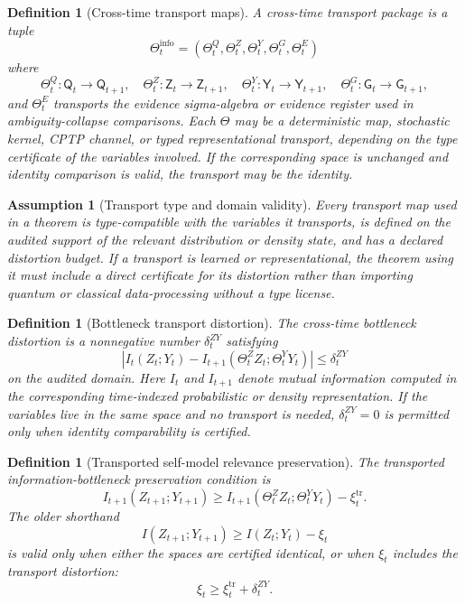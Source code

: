 \documentclass[11pt]{article}
\newtheorem{definition}[theorem]{Definition}
\newtheorem{assumption}[theorem]{Assumption}
\newcommand{\1}{\mathbf{1}}
\begin{document}
\begin{definition}[Cross-time transport maps]
A cross-time transport package is a tuple
\[
\Theta_t^{\mathrm{info}}
=
(\Theta_t^Q,\Theta_t^Z,\Theta_t^Y,\Theta_t^G,\Theta_t^E)
\]
where
\[
\Theta_t^Q:\mathsf Q_t\to\mathsf Q_{t+1},
\quad
\Theta_t^Z:\mathsf Z_t\to\mathsf Z_{t+1},
\quad
\Theta_t^Y:\mathsf Y_t\to\mathsf Y_{t+1},
\quad
\Theta_t^G:\mathsf G_t\to\mathsf G_{t+1},
\]
and \(\Theta_t^E\) transports the evidence sigma-algebra or evidence register used in ambiguity-collapse comparisons. Each \(\Theta\) may be a deterministic map, stochastic kernel, CPTP channel, or typed representational transport, depending on the type certificate of the variables involved. If the corresponding space is unchanged and identity comparison is valid, the transport may be the identity.
\end{definition}

\begin{assumption}[Transport type and domain validity]
\label{ass:transport_type_domain_validity}
Every transport map used in a theorem is type-compatible with the variables it transports, is defined on the audited support of the relevant distribution or density state, and has a declared distortion budget. If a transport is learned or representational, the theorem using it must include a direct certificate for its distortion rather than importing quantum or classical data-processing without a type license.
\end{assumption}

\begin{definition}[Bottleneck transport distortion]
\label{def:bottleneck_transport_distortion}
The cross-time bottleneck distortion is a nonnegative number \(\delta_t^{ZY}\) satisfying
\[
\left|
I_t(Z_t;Y_t)
-
I_{t+1}(\Theta_t^Z Z_t;\Theta_t^Y Y_t)
\right|
\le
\delta_t^{ZY}
\]
on the audited domain. Here \(I_t\) and \(I_{t+1}\) denote mutual information computed in the corresponding time-indexed probabilistic or density representation. If the variables live in the same space and no transport is needed, \(\delta_t^{ZY}=0\) is permitted only when identity comparability is certified.
\end{definition}

\begin{definition}[Transported self-model relevance preservation]
\label{def:transported_self_model_relevance}
The transported information-bottleneck preservation condition is
\[
I_{t+1}(Z_{t+1};Y_{t+1})
\ge
I_{t+1}(\Theta_t^Z Z_t;\Theta_t^Y Y_t)-\xi_t^{\mathrm{tr}}.
\]
The older shorthand
\[
I(Z_{t+1};Y_{t+1})\ge I(Z_t;Y_t)-\xi_t
\]
is valid only when either the spaces are certified identical, or when \(\xi_t\) includes the transport distortion:
\[
\xi_t\ge \xi_t^{\mathrm{tr}}+\delta_t^{ZY}.
\]
\end{definition}
\end{document}

